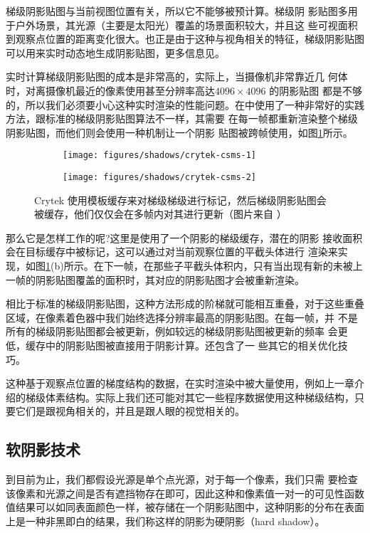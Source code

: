 梯级阴影贴图与当前视图位置有关，所以它不能够被预计算。梯级阴 影贴图多用于户外场景，其光源（主要是太阳光）覆盖的场景面积较大，并且这 些可视面积到观察点位置的距离变化很大。也正是由于这种与视角相关的特征，梯级阴影贴图可以用来实时动态地生成阴影贴图，更多信息见\cite{m:Cascadedshadowmaps}。

实时计算梯级阴影贴图的成本是非常高的，实际上，当摄像机非常靠近几 何体时，对离摄像机最近的像素使用甚至分辨率高达$ 4096 \times 4096$ 的阴影贴图 都是不够的，所以我们必须要小心这种实时渲染的性能问题。在\cite{a:PlayingwithReal-TimeShadows}中使用了一种非常好的实践方法，跟标准的梯级阴影贴图算法不一样，其需要 在每一帧都重新渲染整个梯级阴影贴图，而他们则会使用一种机制让一个阴影 贴图被跨帧使用，如图\ref{f:df-crytek-csm}所示。

\begin{figure}
\begin{fullwidth}
	\begin{subfigure}[b]{0.442\thewidth}
		\texttt{[image: figures/shadows/crytek-csms-1]}	
		\caption{}
	\end{subfigure}
	\begin{subfigure}[b]{0.54\thewidth}
		\texttt{[image: figures/shadows/crytek-csms-2]}	
		\caption{}
	\end{subfigure}
\caption{Crytek 使用模板缓存来对梯级梯级进行标记，然后梯级阴影贴图会被缓存，他们仅仅会在多帧内对其进行更新（图片来自 \cite{a:PlayingwithReal-TimeShadows}）}
\label{f:df-crytek-csm}
\end{fullwidth}
\end{figure}

那么它是怎样工作的呢?这里是使用了一个阴影的梯级缓存，潜在的阴影 接收面积会在目标缓存中被标记，这可以通过对当前观察位置的平截头体进行 渲染来实现，如图\ref{f:df-crytek-csm}(b)所示。在下一帧，在那些子平截头体积内，只有当出现有新的未被上一帧的阴影贴图覆盖的面积时，其对应的阴影贴图才会被重新渲染。

相比于标准的梯级阴影贴图，这种方法形成的阶梯就可能相互重叠，对于这些重叠区域，在像素着色器中我们始终选择分辨率最高的阴影贴图。在每一帧，并 不是所有的梯级阴影贴图都会被更新，例如较远的梯级阴影贴图被更新的频率 会更低，缓存中的阴影贴图被直接用于阴影计算。\cite{a:PlayingwithReal-TimeShadows}还包含了一 些其它的相关优化技巧。

这种基于观察点位置的梯度结构的数据，在实时渲染中被大量使用，例如上一章介绍的梯级体素结构。实际上我们还可能对其它一些程序数据使用这种梯级结构，只要它们是跟视角相关的，并且是跟人眼的视觉相关的。


\subsection{软阴影技术}\label{sec:df-soft-shadow}
到目前为止，我们都假设光源是单个点光源，对于每一个像素，我们只需 要检查该像素和光源之间是否有遮挡物存在即可，因此这种和像素值一对一的可见性函数值结果可以如同表面颜色一样，被存储在一个阴影贴图中，这种阴影的分布在表面上是一种非黑即白的结果，我们称这样的阴影为硬阴影（hard shadow）。

